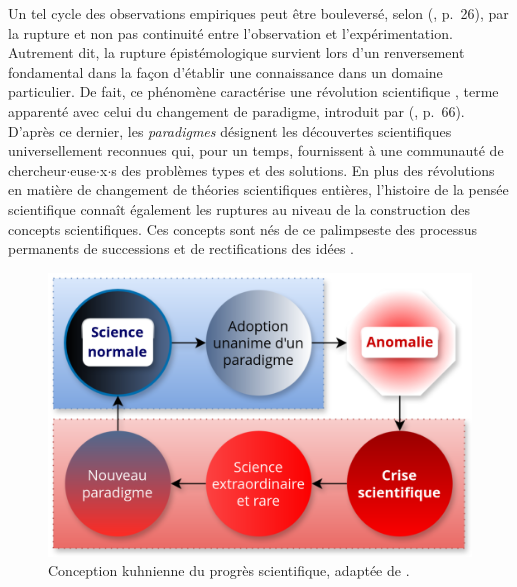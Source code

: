 Un tel cycle des observations empiriques peut être bouleversé, selon \citeauthor{bachelard1934formation} (\citeyear{bachelard1934formation}, p.~26), par la \og{}rupture et non pas continuité entre l'observation et l'expérimentation\fg{}. Autrement dit, la rupture épistémologique survient lors d'un renversement fondamental dans la façon d'établir une connaissance dans un domaine particulier. De fait, ce phénomène caractérise une \og{}révolution scientifique\fg{} \citep[p.~2]{koyre1957closed}, terme apparenté avec celui du \og{}changement de paradigme\fg{}, introduit par \citeauthor{kuhn1962structure} (\citeyear{kuhn1962structure}, p.~66). D'après ce dernier, les \textit{paradigmes} désignent les \og{}découvertes scientifiques universellement reconnues qui, pour un temps, fournissent à une communauté de chercheur$\cdot$euse$\cdot$x$\cdot$s des problèmes types et des solutions\fg{}. En plus des révolutions en matière de changement de théories scientifiques entières, l'histoire de la pensée scientifique connaît également les ruptures au niveau de la construction des concepts scientifiques. Ces concepts sont nés de ce palimpseste des processus permanents de successions et de rectifications des idées \citep[p.~24]{astolfi2008chapitre}. 

\begin{figure}[h] %
    \centering
    \includegraphics[width=\linewidth]{img/changement_paradigme.png}
    \caption{Conception kuhnienne du progrès scientifique, adaptée de \citet{amiri2012}.}
    \label{fig:changement_paradigme}
\end{figure}

